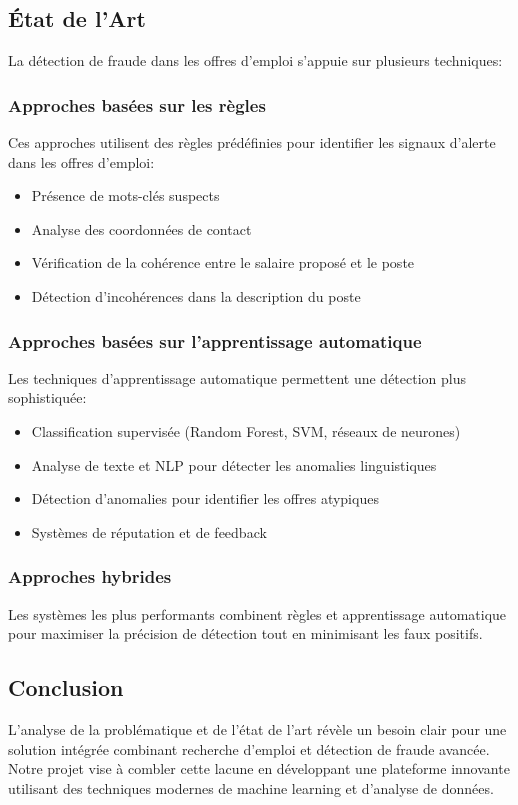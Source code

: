 \documentclass[10pt,a4paper,twocolumn]{article}
\begin{document}
\subsection{État de l'Art}
La détection de fraude dans les offres d'emploi s'appuie sur plusieurs techniques:

\subsubsection{Approches basées sur les règles}
Ces approches utilisent des règles prédéfinies pour identifier les signaux d'alerte dans les offres d'emploi:
\begin{itemize}
    \item Présence de mots-clés suspects
    \item Analyse des coordonnées de contact
    \item Vérification de la cohérence entre le salaire proposé et le poste
    \item Détection d'incohérences dans la description du poste
\end{itemize}

\subsubsection{Approches basées sur l'apprentissage automatique}
Les techniques d'apprentissage automatique permettent une détection plus sophistiquée:
\begin{itemize}
    \item Classification supervisée (Random Forest, SVM, réseaux de neurones)
    \item Analyse de texte et NLP pour détecter les anomalies linguistiques
    \item Détection d'anomalies pour identifier les offres atypiques
    \item Systèmes de réputation et de feedback
\end{itemize}

\subsubsection{Approches hybrides}
Les systèmes les plus performants combinent règles et apprentissage automatique pour maximiser la précision de détection tout en minimisant les faux positifs.

\subsection{Conclusion}
L'analyse de la problématique et de l'état de l'art révèle un besoin clair pour une solution intégrée combinant recherche d'emploi et détection de fraude avancée. Notre projet vise à combler cette lacune en développant une plateforme innovante utilisant des techniques modernes de machine learning et d'analyse de données.
\end{document}
